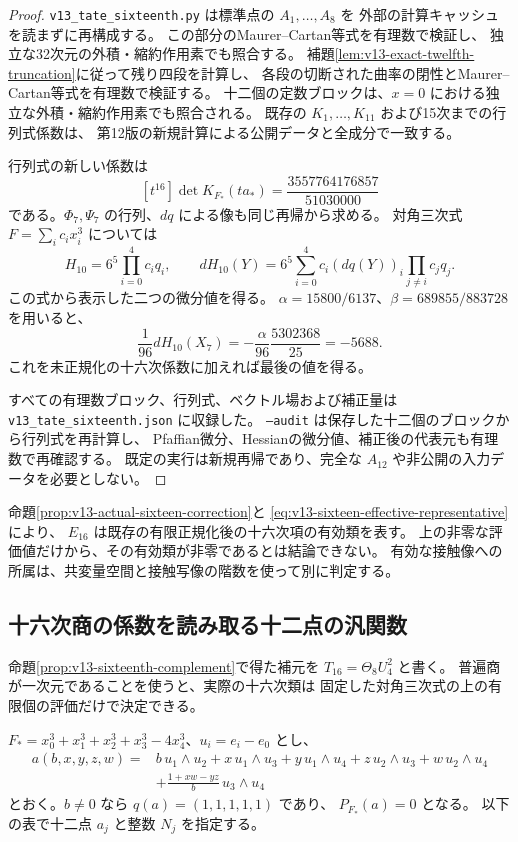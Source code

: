 \documentclass[a4paper,11pt]{ltjsarticle}
\theoremstyle{definition}
\begin{document}
\begin{proof}
\texttt{v13\_tate\_sixteenth.py} は標準点の $A_1,\ldots,A_8$ を
外部の計算キャッシュを読まずに再構成する。
この部分のMaurer--Cartan等式を有理数で検証し、
独立な32次元の外積・縮約作用素でも照合する。
補題\ref{lem:v13-exact-twelfth-truncation}に従って残り四段を計算し、
各段の切断された曲率の閉性とMaurer--Cartan等式を有理数で検証する。
十二個の定数ブロックは、$x=0$ における独立な外積・縮約作用素でも照合される。
既存の $K_1,\ldots,K_{11}$ および15次までの行列式係数は、
第12版の新規計算による公開データと全成分で一致する。

行列式の新しい係数は
\[
 [t^{16}]\det K_{F_*}(ta_*)=\frac{3557764176857}{51030000}
\]
である。$\Phi_7,\Psi_7$ の行列、$dq$ による像も同じ再帰から求める。
対角三次式 $F=\sum_i c_ix_i^3$ については
\[
 H_{10}=6^5\prod_{i=0}^4c_iq_i,\qquad
 dH_{10}(Y)
 =6^5\sum_{i=0}^4 c_i(dq(Y))_i
                      \prod_{j\ne i}c_jq_j.
\]
この式から表示した二つの微分値を得る。
$\alpha=15800/6137$、$\beta=689855/883728$ を用いると、
\[
 \frac1{96}dH_{10}(X_7)
 =-\frac{\alpha}{96}\frac{5302368}{25}
 =-5688.
\]
これを未正規化の十六次係数に加えれば最後の値を得る。

すべての有理数ブロック、行列式、ベクトル場および補正量は
\texttt{v13\_tate\_sixteenth.json} に収録した。
\texttt{--audit} は保存した十二個のブロックから行列式を再計算し、
Pfaffian微分、Hessianの微分値、補正後の代表元も有理数で再確認する。
既定の実行は新規再帰であり、完全な $A_{12}$ や非公開の入力データを必要としない。
\end{proof}

命題\ref{prop:v13-actual-sixteen-correction}と
\eqref{eq:v13-sixteen-effective-representative}により、
$E_{16}$ は既存の有限正規化後の十六次項の有効類を表す。
上の非零な評価値だけから、その有効類が非零であるとは結論できない。
有効な接触像への所属は、共変量空間と接触写像の階数を使って別に判定する。

\subsection{十六次商の係数を読み取る十二点の汎関数}
\label{subsec:v13-sixteenth-rho}

命題\ref{prop:v13-sixteenth-complement}で得た補元を
$T_{16}=\Theta_8U_4^2$ と書く。
普遍商が一次元であることを使うと、実際の十六次類は
固定した対角三次式の上の有限個の評価だけで決定できる。

$F_*=x_0^3+x_1^3+x_2^3+x_3^3-4x_4^3$、$u_i=e_i-e_0$ とし、
\begin{align*}
 a(b,x,y,z,w)={}&b\,u_1\wedge u_2+x\,u_1\wedge u_3
       +y\,u_1\wedge u_4+z\,u_2\wedge u_3+w\,u_2\wedge u_4\\
 &+\frac{1+xw-yz}{b}\,u_3\wedge u_4
\end{align*}
とおく。$b\ne0$ なら $q(a)=(1,1,1,1,1)$ であり、
$P_{F_*}(a)=0$ となる。
以下の表で十二点 $a_j$ と整数 $N_j$ を指定する。
\end{document}
